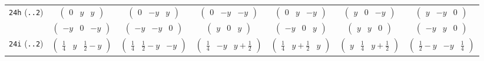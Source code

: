 \documentclass[fleqn,9pt,landscape]{jsarticle}
\begin{document}
\begin{center}
\begin{longtable}{ccccccc}
{\tt 24h} ({\tt ..2}) & $ \begin{pmatrix} 0 & y & y \end{pmatrix} $ & $ \begin{pmatrix} 0 & - y & y \end{pmatrix} $ & $ \begin{pmatrix} 0 & - y & - y \end{pmatrix} $ & $ \begin{pmatrix} 0 & y & - y \end{pmatrix} $ & $ \begin{pmatrix} y & 0 & - y \end{pmatrix} $ & $ \begin{pmatrix} y & - y & 0 \end{pmatrix} $ \\
& $ \begin{pmatrix} - y & 0 & - y \end{pmatrix} $ & $ \begin{pmatrix} - y & - y & 0 \end{pmatrix} $ & $ \begin{pmatrix} y & 0 & y \end{pmatrix} $ & $ \begin{pmatrix} - y & 0 & y \end{pmatrix} $ & $ \begin{pmatrix} y & y & 0 \end{pmatrix} $ & $ \begin{pmatrix} - y & y & 0 \end{pmatrix} $ \\ \hline
{\tt 24i} ({\tt ..2}) & $ \begin{pmatrix} \frac{1}{4} & y & \frac{1}{2} - y \end{pmatrix} $ & $ \begin{pmatrix} \frac{1}{4} & \frac{1}{2} - y & - y \end{pmatrix} $ & $ \begin{pmatrix} \frac{1}{4} & - y & y + \frac{1}{2} \end{pmatrix} $ & $ \begin{pmatrix} \frac{1}{4} & y + \frac{1}{2} & y \end{pmatrix} $ & $ \begin{pmatrix} y & \frac{1}{4} & y + \frac{1}{2} \end{pmatrix} $ & $ \begin{pmatrix} \frac{1}{2} - y & - y & \frac{1}{4} \end{pmatrix} $ \\

\end{longtable}
\end{center}
\end{document}
